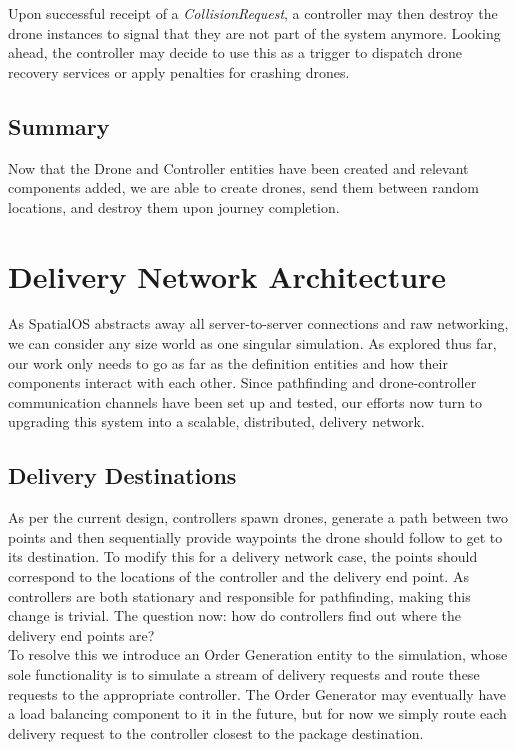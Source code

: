 \documentclass[a4paper,11pt,titlepage]{report}
\begin{document}
Upon successful receipt of a \textit{CollisionRequest}, a controller may then destroy the drone instances to signal that they are not part of the system anymore. Looking ahead, the controller may decide to use this as a trigger to dispatch drone recovery services or apply penalties for crashing drones.

\section{Summary}
Now that the Drone and Controller entities have been created and relevant components added, we are able to create drones, send them between random locations, and destroy them upon journey completion.


\newpage
\chapter{Delivery Network Architecture}
As SpatialOS abstracts away all server-to-server connections and raw networking, we can consider any size world as one singular simulation. As explored thus far, our work only needs to go as far as the definition entities and how their components interact with each other. Since pathfinding and drone-controller communication channels have been set up and tested, our efforts now turn to upgrading this system into a scalable, distributed, delivery network.

\section{Delivery Destinations}
As per the current design, controllers spawn drones, generate a path between two points and then sequentially provide waypoints the drone should follow to get to its destination. To modify this for a delivery network case, the points should correspond to the locations of the controller and the delivery end point. As controllers are both stationary and responsible for pathfinding, making this change is trivial. The question now: how do controllers find out where the delivery end points are?\\

To resolve this we introduce an Order Generation entity to the simulation, whose sole functionality is to simulate a stream of delivery requests and route these requests to the appropriate controller. The Order Generator may eventually have a load balancing component to it in the future, but for now we simply route each delivery request to the controller closest to the package destination.\\
\end{document}
